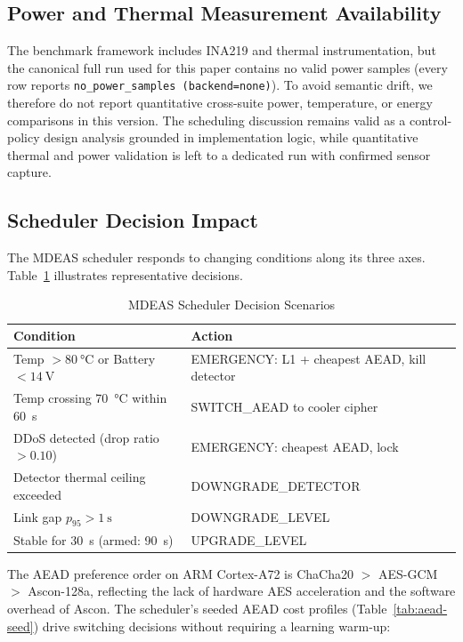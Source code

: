 \documentclass[conference]{IEEEtran}
\begin{document}
\subsection{Power and Thermal Measurement Availability}

The benchmark framework includes INA219 and thermal instrumentation, but the canonical full run used for this paper contains no valid power samples (every row reports \texttt{no\_power\_samples (backend=none)}).
To avoid semantic drift, we therefore do not report quantitative cross-suite power, temperature, or energy comparisons in this version.
The scheduling discussion remains valid as a control-policy design analysis grounded in implementation logic, while quantitative thermal and power validation is left to a dedicated run with confirmed sensor capture.

\subsection{Scheduler Decision Impact}

The MDEAS scheduler responds to changing conditions along its three axes.
Table~\ref{tab:scheduler-scenarios} illustrates representative decisions.

\begin{table}[t]
\centering
\caption{MDEAS Scheduler Decision Scenarios}
\label{tab:scheduler-scenarios}
\small
\begin{tabular}{@{}p{3.5cm}p{4cm}@{}}
\toprule
\textbf{Condition} & \textbf{Action} \\
\midrule
Temp $> \SI{80}{\celsius}$ or Battery $< \SI{14}{\volt}$ & EMERGENCY: L1 + cheapest AEAD, kill detector \\
Temp crossing \SI{70}{\celsius} within \SI{60}{\second} & SWITCH\_AEAD to cooler cipher \\
DDoS detected (drop ratio $> 0.10$) & EMERGENCY: cheapest AEAD, lock \\
Detector thermal ceiling exceeded & DOWNGRADE\_DETECTOR \\
Link gap $p_{95} > \SI{1}{\second}$ & DOWNGRADE\_LEVEL \\
Stable for \SI{30}{\second} (armed: \SI{90}{\second}) & UPGRADE\_LEVEL \\
\bottomrule
\end{tabular}
\end{table}

The AEAD preference order on ARM Cortex-A72 is ChaCha20 $>$ AES-GCM $>$ Ascon-128a, reflecting the lack of hardware AES acceleration and the software overhead of Ascon.
The scheduler's seeded AEAD cost profiles (Table~\ref{tab:aead-seed}) drive switching decisions without requiring a learning warm-up:
\end{document}

